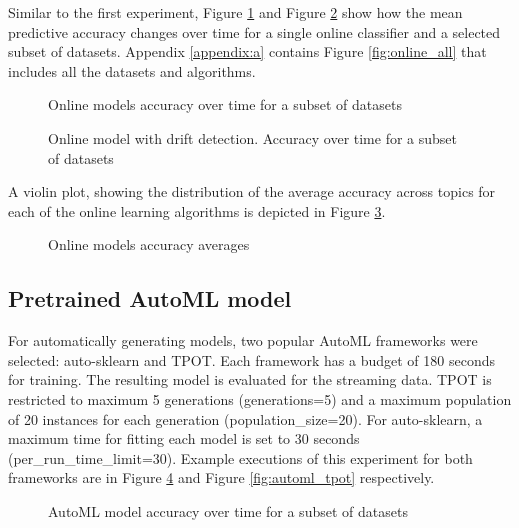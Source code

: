 \documentclass{sig-alternate-br}
\begin{document}
Similar to the first experiment, Figure \ref{fig:online_ht} and Figure \ref{fig:online_hat} show how the mean predictive accuracy changes over time for a single online classifier and a selected subset of datasets. Appendix \ref{appendix:a} contains Figure \ref{fig:online_all} that includes all the datasets and algorithms.

\begin{figure}[h]
\centering 
{}
\caption{Online models accuracy over time for a subset of datasets}
\label{fig:online_ht}
\end{figure}

\begin{figure}[h!]
\centering 
{}
\caption{Online model with drift detection. Accuracy over time for a subset of datasets}
\label{fig:online_hat}
\end{figure}

A violin plot, showing the distribution of the average accuracy across topics for each of the online learning algorithms is depicted in Figure \ref{fig:online_violin}.

\begin{figure}[h]
\centering 
{}
\caption{Online models accuracy averages}
\label{fig:online_violin}
\end{figure}

\subsection{Pretrained AutoML model}

For automatically generating models, two popular \cite{gijsbers2019open} AutoML frameworks were selected: auto-sklearn and TPOT. Each framework has a budget of 180 seconds for training. The resulting model is evaluated for the streaming data. TPOT is restricted to maximum 5 generations (generations=5) and a maximum population of 20 instances for each generation (population\_size=20). For auto-sklearn, a maximum time for fitting each model is set to 30 seconds (per\_run\_time\_limit=30). Example executions of this experiment for both frameworks are in Figure \ref{fig:automl_ask} and Figure \ref{fig:automl_tpot} respectively.

\begin{figure}[h]
\centering 
{}
\caption{AutoML model accuracy over time for a subset of datasets}
\label{fig:automl_ask}
\end{figure}
\end{document}
